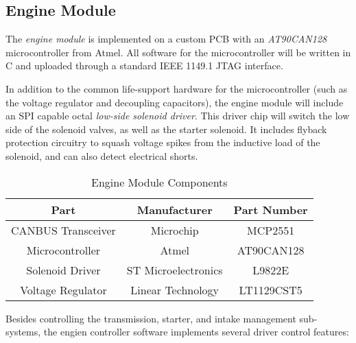 \subsection{Engine Module}
\label{sec:engine_module}

The \emph{engine module} is implemented on a custom PCB with an \emph{AT90CAN128} microcontroller from Atmel. All software for the microcontroller will be written in C and uploaded through a standard IEEE 1149.1 JTAG interface. 

In addition to the common life-support hardware for the microcontroller (such as the voltage regulator and decoupling capacitors), the engine module will include an SPI capable octal \emph{low-side solenoid driver}. This driver chip will switch the low side of the solenoid valves, as well as the starter solenoid. It includes flyback protection circuitry to squash voltage spikes from the inductive load of the solenoid, and can also detect electrical shorts. 

\begin{table}[H]
	\caption{Engine Module Components\label{tab:Engine-Module}}
	\centering
	\begin{tabular}{|c|c|c|}
		\hline 
		Part & Manufacturer & Part Number\tabularnewline 
		\hline \hline
		CANBUS Transceiver & Microchip & MCP2551\tabularnewline \hline
		Microcontroller & Atmel & AT90CAN128\tabularnewline \hline
		Solenoid Driver & ST Microelectronics & L9822E\tabularnewline \hline
		Voltage Regulator & Linear Technology & LT1129CST5\tabularnewline		
		\hline
	\end{tabular}
\end{table}

Besides controlling the transmission, starter, and intake management sub-systems, the engien controller software implements several driver control features:

